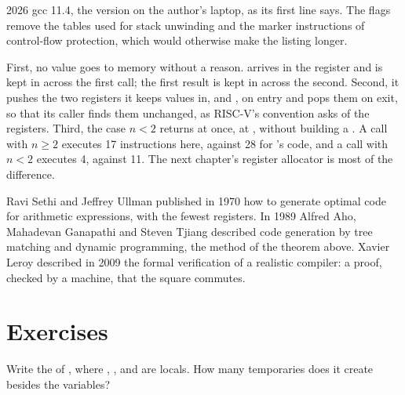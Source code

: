 \label{out:b3:code-generation:gcc}

\begin{dated}{2026}
gcc 11.4, the version on the author's laptop, as its first line says. The flags remove the tables used for stack unwinding and the marker instructions of control-flow protection, which would otherwise make the listing longer.
\end{dated}

First, no value goes to memory without a reason.  arrives in the register  and is kept in  across the first call; the first result is kept in  across the second. Second, it pushes the two registers it keeps values in,  and , on entry and pops them on exit, so that its caller finds them unchanged, as RISC-V's convention asks of the  registers. Third, the case $n < 2$ returns at once, at , without building a . A call with $n \ge 2$ executes 17 instructions here, against 28 for 's code, and a call with $n < 2$ executes 4, against 11. The next chapter's register allocator is most of the difference.

\begin{history}
Ravi Sethi and Jeffrey Ullman published in 1970 how to generate optimal code for arithmetic expressions, with the fewest registers. %
In 1989 Alfred Aho, Mahadevan Ganapathi and Steven Tjiang described code generation by tree matching and dynamic programming, the method of the theorem above. %
Xavier Leroy described in 2009 the formal verification of a realistic compiler: a proof, checked by a machine, that the square commutes. %
\end{history}

\section{Exercises}\label{sec:b3:code-generation:exercises}

\begin{exercise}[$\star$]\label{exo:b3:code-generation:1}
Write the  of , where , ,  and  are locals. How many temporaries does it create besides the variables?
\end{exercise}

